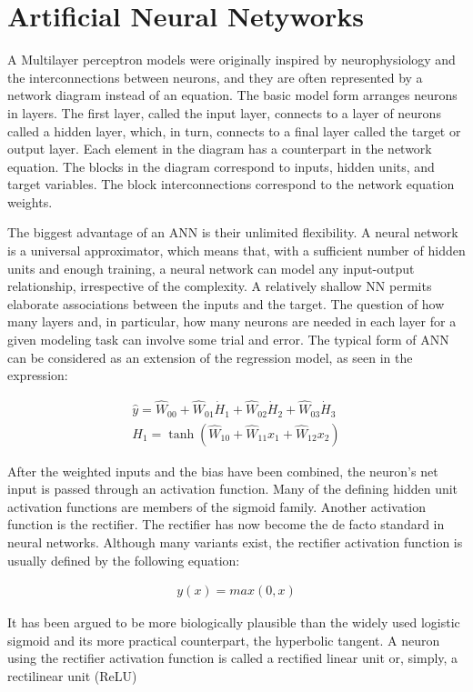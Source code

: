 \section{Artificial Neural Netyworks}

A Multilayer perceptron models were originally inspired by neurophysiology and the interconnections between neurons, and they are often represented by a network diagram instead of an equation. The basic model form arranges neurons in layers. The first layer, called the input layer, connects to a layer of neurons called a hidden layer, which, in turn, connects to a final layer called the target or output layer. Each element in the diagram has a counterpart in the network equation. The blocks in the diagram correspond to inputs, hidden units, and target variables. The block interconnections correspond to the network equation weights.

The biggest advantage of an ANN is their unlimited flexibility. A neural network is a universal approximator, which means that, with a sufficient number of hidden units and enough training, a neural network can model any input-output relationship, irrespective of the complexity. A relatively shallow NN permits elaborate associations
between the inputs and the target. The question of how many layers and, in particular, how many neurons are needed in each layer for a given modeling task can involve some trial and error. The typical form of ANN can be considered as an extension of the regression model, as seen in the expression:

\begin{align}
    \hat{y} = \hat{W}_{00} + \hat{W}_{01} \dot H_1 + \hat{W}_{02} \dot H_2 + \hat{W}_{03} \dot H_3 \\
    H_1 = \tanh(\hat{W}_{10} + \hat{W}_{11}x_1 + \hat{W}_{12}x_2)
\end{align}

After the weighted inputs and the bias have been combined, the neuron’s net input is passed through an activation function. Many of the defining hidden unit activation functions are members of the sigmoid family. Another activation function is the rectifier. The rectifier has now become the de facto standard in neural networks. Although many variants exist, the rectifier activation function is usually defined by
the following equation:

\begin{align}
    y(x) = max(0,x)
\end{align}

It has been argued to be more biologically plausible than the widely used logistic sigmoid and its more practical counterpart, the hyperbolic tangent. A neuron using the rectifier activation function is called a rectified linear unit or, simply, a rectilinear unit (ReLU)

